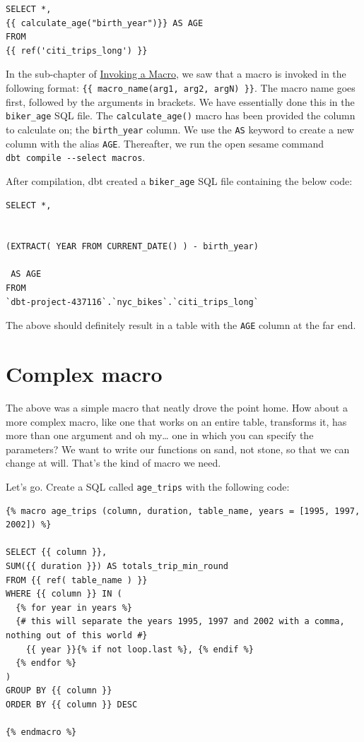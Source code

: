 \documentclass[
]{book}
\begin{document}
\begin{verbatim}
SELECT *, 
{{ calculate_age("birth_year")}} AS AGE
FROM 
{{ ref('citi_trips_long') }}
\end{verbatim}

In the sub-chapter of \protect\hyperlink{ux5cux23Invokingux5cux2520aux5cux2520macro}{Invoking a Macro}, we saw that a macro is invoked in the following format: \texttt{\{\{\ macro\_name(arg1,\ arg2,\ argN)\ \}\}}. The macro name goes first, followed by the arguments in brackets. We have essentially done this in the \texttt{biker\_age} SQL file. The \texttt{calculate\_age()} macro has been provided the column to calculate on; the \texttt{birth\_year} column. We use the \texttt{AS} keyword to create a new column with the alias \texttt{AGE}. Thereafter, we run the open sesame command \texttt{dbt\ compile\ -\/-select\ macros}.

After compilation, dbt created a \texttt{biker\_age} SQL file containing the below code:

\begin{verbatim}
SELECT *, 


(EXTRACT( YEAR FROM CURRENT_DATE() ) - birth_year) 

 AS AGE
FROM 
`dbt-project-437116`.`nyc_bikes`.`citi_trips_long`
\end{verbatim}

The above should definitely result in a table with the \texttt{AGE} column at the far end.

\hypertarget{complex-macro}{%
\section{Complex macro}\label{complex-macro}}

The above was a simple macro that neatly drove the point home. How about a more complex macro, like one that works on an entire table, transforms it, has more than one argument and oh my\ldots{} one in which you can specify the parameters? We want to write our functions on sand, not stone, so that we can change at will. That's the kind of macro we need.

Let's go. Create a SQL called \texttt{age\_trips} with the following code:

\begin{verbatim}
{% macro age_trips (column, duration, table_name, years = [1995, 1997, 2002]) %}

SELECT {{ column }}, 
SUM({{ duration }}) AS totals_trip_min_round
FROM {{ ref( table_name ) }}
WHERE {{ column }} IN (
  {% for year in years %}
  {# this will separate the years 1995, 1997 and 2002 with a comma, nothing out of this world #}
    {{ year }}{% if not loop.last %}, {% endif %}
  {% endfor %}
)
GROUP BY {{ column }}
ORDER BY {{ column }} DESC

{% endmacro %}
\end{verbatim}
\end{document}
